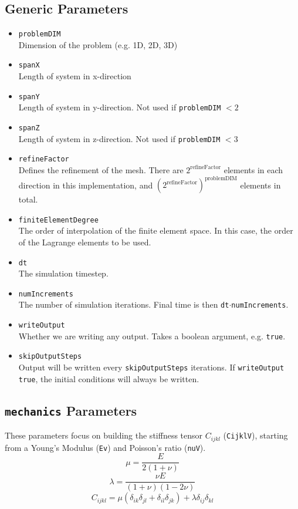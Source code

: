 \documentclass[11pt]{article}
\begin{document}
\subsection{Generic Parameters}
\begin{itemize}
\item \texttt{problemDIM} \\
	Dimension of the problem (e.g. 1D, 2D, 3D)
\item \texttt{spanX} \\
	Length of system in x-direction
\item \texttt{spanY} \\
	Length of system in y-direction.  Not used if \texttt{problemDIM} $< 2$
\item \texttt{spanZ} \\
	Length of system in z-direction.  Not used if \texttt{problemDIM} $< 3$
\item \texttt{refineFactor} \\
	Defines the refinement of the mesh.  There are $2^{\mathrm{refineFactor}}$ elements in each direction in this implementation, and 						$\left( 2^{\mathrm{refineFactor}} \right)^{\mathrm{problemDIM}}$ elements in total.
\item \texttt{finiteElementDegree} \\
	The order of interpolation of the finite element space.  In this case, the order of the Lagrange elements to be used.
\item \texttt{dt} \\
	The simulation timestep.
\item \texttt{numIncrements} \\
	The number of simulation iterations.  Final time is then \texttt{dt}$\cdot$\texttt{numIncrements}.
\item \texttt{writeOutput} \\
	Whether we are writing any output.  Takes a boolean argument, e.g. \texttt{true}.
\item \texttt{skipOutputSteps} \\
	Output will be written every \texttt{skipOutputSteps} iterations.  If \texttt{writeOutput} \texttt{true}, the initial conditions will always be written.
\end{itemize}


\subsection{\texttt{mechanics} Parameters}
These parameters focus on building the stiffness tensor $C_{ijkl}$ (\texttt{CijklV}), starting from a Young's Modulus (\texttt{Ev}) and Poisson's ratio (\texttt{nuV}).
\[ \mu = \frac{E}{2(1+\nu)} \]
\[ \lambda = \frac{\nu E}{(1+\nu)(1-2\nu)} \]
\[ C_{ijkl} = \mu (\delta_{ik} \delta_{jl}+\delta_{il} \delta_{jk}) + \lambda \delta_{ij} \delta_{kl} \]
\end{document}
